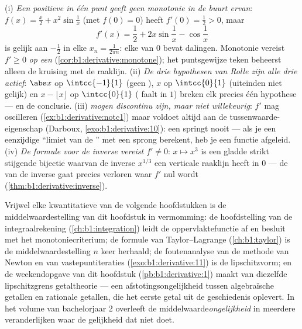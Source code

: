 \begin{remark}
(i) \emph{Een positieve  in één punt geeft geen monotonie
in de buurt ervan}: $f(x) = \frac x2 + x^2\sin\frac1x$ (met $f(0)
= 0$) heeft $f'(0) = \frac12 > 0$, maar
\[
f'(x) = \frac12 + 2x\sin\frac1x - \cos\frac1x
\]
is gelijk aan $-\frac12$ in elke $x_n = \frac{1}{2\pi n}$: elke
 van $0$ bevat dalingen. Monotonie vereist $f' \geq 0$
\emph{op een } (\cref{cor:b1:derivative:monotone}); het
puntsgewijze teken beheerst alleen de kruising met de raaklijn.
(ii) \emph{De drie hypothesen van Rolle zijn alle drie actief}:
$\abs x$ op $\intcc{-1}{1}$ (geen  ), $x$
op $\intcc{0}{1}$ (uiteinden niet gelijk) en $x - \lfloor
x\rfloor$ op $\intcc{0}{1}$ ( faalt in $1$) breken
elk precies één hypothese --- en de conclusie. (iii)
\emph{ mogen discontinu zijn, maar niet willekeurig}:
$f'$ mag oscilleren (\cref{ex:b1:derivative:notc1}) maar voldoet
altijd aan de tussenwaarde-eigenschap (Darboux,
\cref{exo:b1:derivative:10}): een  springt nooit --- als
je een eenzijdige ``limiet van de '' met een sprong
berekent, heb je een  functie afgeleid. (iv)
\emph{De formule voor de inverse vereist $f' \neq 0$}: $x \mapsto
x^3$ is een gladde strikt stijgende bijectie waarvan de inverse
$x^{1/3}$ een verticale raaklijn heeft in $0$ --- de
 van de inverse gaat precies verloren waar $f'$ nul
wordt (\cref{thm:b1:derivative:inverse}).
\end{remark}

\begin{remark}
Vrijwel elke kwantitatieve  van de volgende hoofdstukken
is de middelwaardestelling van dit hoofdstuk in vermomming: de
hoofdstelling van de integraalrekening
(\cref{ch:b1:integration}) leidt de oppervlaktefunctie af en
besluit met het monotoniecriterium; de formule van
Taylor--Lagrange (\cref{ch:b1:taylor}) is de middelwaardestelling
$n$ keer herhaald; de foutenanalyse van de methode van Newton en
van vastepuntiteraties (\cref{exo:b1:derivative:11}) is de
lipschitzvorm; en de weekendopgave van dit hoofdstuk
(\cref{pb:b1:derivative:1}) maakt van diezelfde lipschitzgrens
getaltheorie --- een afstotingsongelijkheid tussen algebraïsche
getallen en rationale getallen, die het eerste 
getal uit de geschiedenis oplevert. In het volume van
bachelorjaar 2 overleeft de middelwaarde\emph{ongelijkheid} in
meerdere veranderlijken waar de gelijkheid dat niet doet.
\end{remark}

